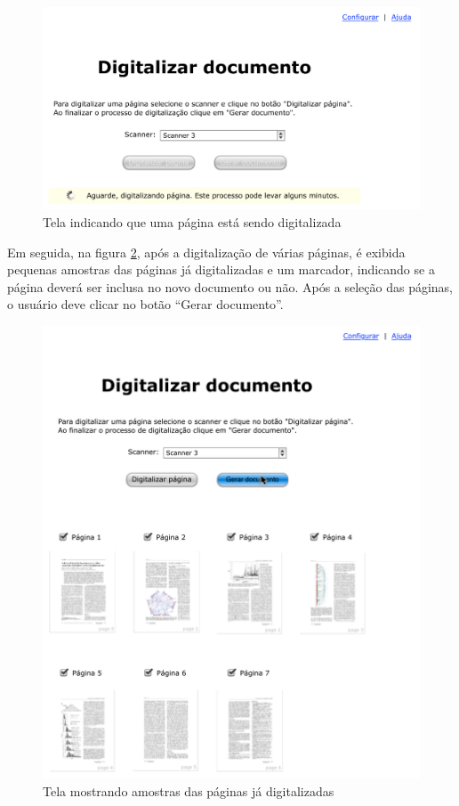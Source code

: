 \begin{figure}[h]
 \centering
  \includegraphics[scale=0.6]{img/mockups/digitalizacao-4.pdf}
  \caption {Tela indicando que uma página está sendo digitalizada}
  \label{fig:dig_4}
\end{figure}

Em seguida, na figura \ref{fig:dig_5}, após a digitalização de várias páginas, é exibida pequenas amostras das páginas já digitalizadas e um marcador, indicando se a página deverá ser inclusa no novo documento ou não. Após a seleção das páginas, o usuário deve clicar no botão ``Gerar documento''.

\begin{figure}[h]
 \centering
  \includegraphics[scale=0.6]{img/mockups/digitalizacao-5.pdf}
  \caption {Tela mostrando amostras das páginas já digitalizadas}
  \label{fig:dig_5}
\end{figure}


